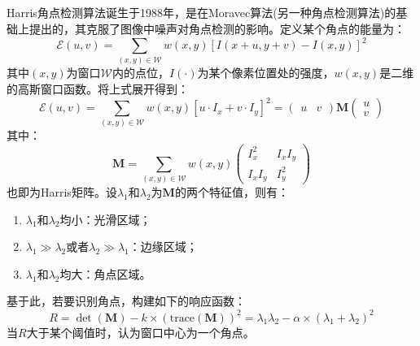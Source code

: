 \documentclass[12pt, onecolumn]{article}
\newcommand\normf{\fangsong}
\begin{document}
	\subsection{\normf{Harris角点}}
	Harris角点检测算法诞生于1988年，是在Moravec算法(另一种角点检测算法)的基础上提出的，其克服了图像中噪声对角点检测的影响。定义某个角点的能量为：
	\begin{equation}
	\mathcal{E}(u,v)=\sum_{(x,y)\in\mathcal{W}}w(x,y)\left[ 
	I(x+u,y+v)-I(x,y)
	\right] ^2
	\end{equation}
	其中$(x,y)$为窗口$\mathcal{W}$内的点位，$I(\cdot)$为某个像素位置处的强度，$w(x,y)$是二维的高斯窗口函数。将上式展开得到：
	\begin{equation}
	\mathcal{E}(u,v)=\sum_{(x,y)\in\mathcal{W}}w(x,y)\left[ 
		u\cdot I_x+v\cdot I_y
		\right] ^2=\begin{pmatrix}
		u&v
		\end{pmatrix}\boldsymbol{M}\begin{pmatrix}
		u\\v
		\end{pmatrix}
	\end{equation}
	其中：
	\begin{equation}
	\boldsymbol{M}=\sum_{(x,y)\in\mathcal{W}}w(x,y)\begin{pmatrix}
	I_x^2 &I_xI_y\\
	I_xI_y&I_y^2
	\end{pmatrix}
	\end{equation}
	也即为Harris矩阵。设$\lambda_1$和$\lambda_2$为$\boldsymbol{M}$的两个特征值，则有：
	\begin{enumerate}
	\item $\lambda_1$和$\lambda_2$均小：光滑区域；
	\item $\lambda_1\gg \lambda_2$或者$\lambda_2\gg \lambda_1$：边缘区域；
	\item $\lambda_1$和$\lambda_2$均大：角点区域。
	\end{enumerate}
	基于此，若要识别角点，构建如下的响应函数：
	\begin{equation}
	R=\det(\boldsymbol{M})-k\times (\mathrm{trace}(\boldsymbol{M}))^2=\lambda_1\lambda_2-\alpha\times(\lambda_1+\lambda_2)^2
	\end{equation}
	当$R$大于某个阈值时，认为窗口中心为一个角点。
	
\end{document}
